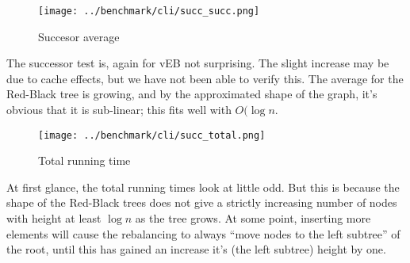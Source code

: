 \begin{figure}[htb]
\centering
\texttt{[image: ../benchmark/cli/succ\_succ.png]}
\caption{Succesor average}
\label{fig:succ-succ}
\end{figure}

The successor test is, again for vEB not surprising. The slight increase may be due to cache effects, but we have not been able to verify this. The average for the Red-Black tree is growing, and by the approximated shape of the graph, it's obvious that it is sub-linear; this fits well with $O(\log n$.

\begin{figure}[htb]
\centering
\texttt{[image: ../benchmark/cli/succ\_total.png]}
\caption{Total running time}
\label{fig:succ-tot}
\end{figure}

At first glance, the total running times look at little odd. But this is because the shape of the Red-Black trees does not give a strictly increasing number of nodes with height at least $\log n$ as the tree grows. At some point, inserting more elements will cause the rebalancing to always ``move nodes to the left subtree'' of the root, until this has gained an increase it's (the left subtree) height by one.